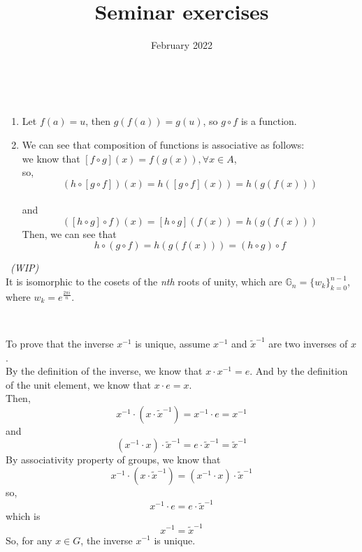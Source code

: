 \documentclass{article}
\title{Seminar exercises}
\author{ }
\date{February 2022}
\theoremstyle{definition}
\newenvironment{solution}[1]
{\renewcommand\theinnersolution{#1}\innersolution}
{\endinnersolution}
\begin{document}
\maketitle

\begin{solution}{1.9}\
	\begin{enumerate}[1.]
		\item Let $f(a) = u$, then $g(f(a)) = g(u)$, so $g \circ f$ is a function.
		\item We can see that composition of functions is associative as follows:\\
			we know that $[ f \circ g](x) = f(g(x)), \forall x \in A$,\\
			so,
			$$(h \circ [g \circ f])(x) = h([g \circ f](x)) = h(g(f(x)))$$
			\\
			and
			$$([h \circ g] \circ f)(x) = [h \circ g](f(x)) = h(g(f(x)))$$
			Then, we can see that $$h \circ (g \circ f) = h(g(f(x))) = (h \circ g) \circ f$$
	\end{enumerate}
\end{solution}

\begin{solution}{1.28}\
	\emph{(WIP)}\\
	It is isomorphic to the cosets of the \emph{nth} roots of unity, which are $\mathbb{G}_n = \{w_k\}^{n-1}_{k=0}$, where $w_k=e^{\frac{2 \pi i}{n}}$.
\end{solution}

\begin{solution}{2.2}\

	To prove that the inverse $x^{-1}$ is unique, assume $x^{-1}$ and $\tilde{x}^{-1}$ are two inverses of $x$.\\
	By the definition of the inverse, we know that $x \cdot x^{-1} = e$. And by the definition of the unit element, we know that $x \cdot e = x$.\\
	Then, $$x^{-1} \cdot (x \cdot \tilde{x}^{-1}) = x^{-1} \cdot e = x^{-1}$$
	and $$(x^{-1} \cdot x) \cdot \tilde{x}^{-1} = e \cdot \tilde{x}^{-1} = \tilde{x}^{-1}$$
	By associativity property of groups, we know that
	$$x^{-1} \cdot (x \cdot \tilde{x}^{-1}) = (x^{-1} \cdot x) \cdot \tilde{x}^{-1}$$
	so, $$x^{-1} \cdot e = e \cdot \tilde{x}^{-1}$$
	which is $$x^{-1} = \tilde{x}^{-1}$$
	So, for any $x \in G$, the inverse $x^{-1}$ is unique.
\end{solution}
\end{document}
